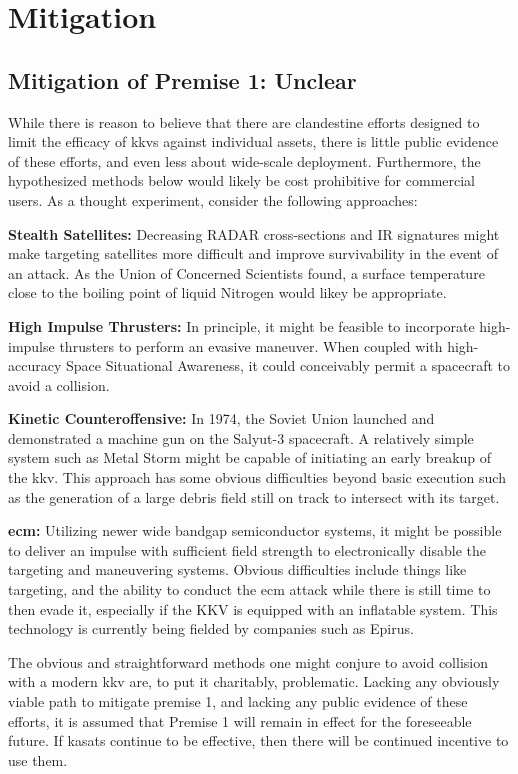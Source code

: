 \section{Mitigation}

\subsection{Mitigation of Premise 1: Unclear}
While there is reason to believe that there are clandestine efforts
designed to limit the efficacy of \acp{kkv} against individual assets,
there is little public evidence of these efforts, and even less about
wide-scale deployment.  Furthermore, the hypothesized methods below
would likely be cost prohibitive for commercial users.  As a thought
experiment, consider the following approaches:

\textbf{Stealth Satellites:} Decreasing RADAR cross-sections and IR
signatures might make targeting satellites more difficult and improve
survivability in the event of an attack.  As the Union of Concerned
Scientists found, a surface temperature close to the boiling point of
liquid Nitrogen would likey be appropriate.\cite[p48]{abm-me-not}

\textbf{High Impulse Thrusters:} In principle, it might be feasible to
incorporate high-impulse thrusters to perform an evasive maneuver.
When coupled with high-accuracy Space Situational Awareness, it could
conceivably permit a spacecraft to avoid a collision.

\textbf{Kinetic Counteroffensive:} In 1974, the Soviet Union launched
and demonstrated a machine gun on the Salyut-3 spacecraft.  A
relatively simple system such as Metal Storm might be capable of
initiating an early breakup of the \ac{kkv}.  This approach has some
obvious difficulties beyond basic execution such as the generation of
a large debris field still on track to intersect with its target.

\textbf{\acl{ecm}:} Utilizing newer wide bandgap semiconductor
systems, it might be possible to deliver an impulse with sufficient
field strength to electronically disable the  targeting and
maneuvering systems.  Obvious difficulties include things like
targeting, and the ability to conduct the \ac{ecm} attack while there
is still time to then evade it, especially if the KKV is equipped with
an inflatable system.  This technology is currently being fielded by
companies such as Epirus.\cite[epirus]{xxx}

The obvious and straightforward methods one might conjure to avoid
collision with a modern \ac{kkv} are, to put it charitably,
problematic.  Lacking any obviously viable path to mitigate premise 1,
and lacking any public evidence of these efforts, it is assumed that
Premise 1 will remain in effect for the foreseeable future.  If
\acp{kasat} continue to be effective, then there will be continued
incentive to use them.

